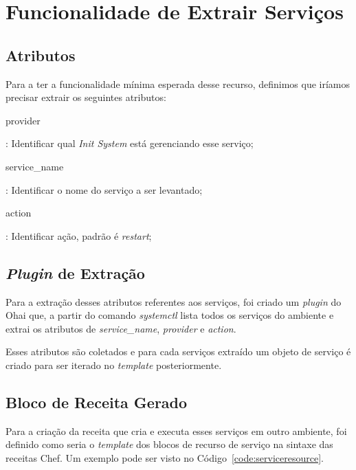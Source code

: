 \section{Funcionalidade de Extrair Serviços}
\label{sec:services}

\subsection{Atributos}

Para a ter a funcionalidade mínima esperada desse recurso, definimos que iríamos precisar
extrair os seguintes atributos:


\begin{itemize}
    {\itshape\item provider}: Identificar qual \textit{Init System} está gerenciando
esse serviço;
    {\itshape\item service\_name}: Identificar o nome do serviço a
ser levantado;
    {\itshape\item action}: Identificar ação, padrão é \textit{restart};
\end{itemize}

\subsection{\textit{Plugin} de Extração}
Para a extração desses atributos referentes aos serviços, foi criado um \textit{plugin} do
Ohai que, a partir do comando \textit{systemctl} lista todos os serviços do ambiente
e extrai os atributos de \textit{service\_name}, \textit{provider}
e \textit{action}.

Esses atributos são coletados e para cada serviços extraído um objeto de serviço
é criado para ser iterado no \textit{template} posteriormente.

\subsection{Bloco de Receita Gerado}
Para a criação da receita que cria e executa esses serviços em outro ambiente, foi 
definido como seria o \textit{template} dos blocos de recurso de serviço na sintaxe das 
receitas Chef. Um exemplo pode ser visto no Código~\ref{code:serviceresource}.

\noindent\begin{minipage}{\textwidth}
  \lstset{style=shell}
  
\end{minipage}\hfill

